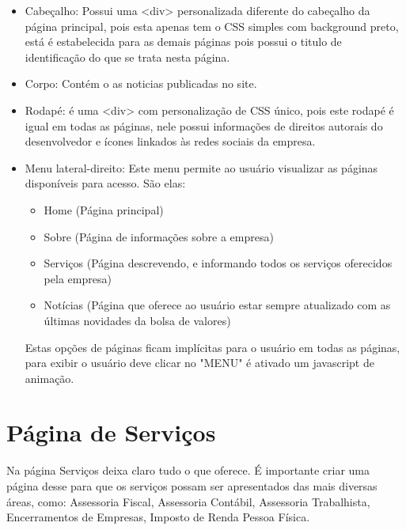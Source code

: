 \documentclass[
	12pt,				%
    oneside,			%
	a4paper,			%
	english,			%
	french,				%
	spanish,			%
	brazil,				%
	]{abntex2}
\begin{document}
\begin{itemize}
	\item{Cabeçalho: Possui uma <div> personalizada diferente do cabeçalho da página principal, pois esta apenas tem o CSS simples com background preto, está é estabelecida para as demais páginas pois possui o titulo de identificação do que se trata nesta página.}
	\item{Corpo: Contém o as noticias publicadas no site.}
	\item{Rodapé: é uma <div> com personalização de CSS único, pois este rodapé é igual em todas as páginas, nele possui informações de direitos autorais do desenvolvedor e ícones linkados às redes sociais da empresa.}
	
	\item{Menu lateral-direito: Este menu permite ao usuário visualizar as páginas disponíveis para acesso. São elas: 
	
	\begin{itemize}
			
	\item{Home (Página principal)}
	\item{Sobre (Página de informações sobre a empresa)}
	\item{Serviços (Página descrevendo, e informando todos os serviços oferecidos pela empresa)} 		    \item{Notícias (Página que oferece ao usuário estar sempre atualizado com as últimas novidades da bolsa de valores)}
	
	\end{itemize}
	
	Estas opções de páginas ficam implícitas para o usuário em todas as páginas, para exibir o usuário deve clicar no "MENU" é ativado um javascript de animação.
}
\end{itemize}

\chapter{Página de Serviços}

Na página Serviços deixa claro tudo o que oferece. É importante criar uma página desse para que os serviços possam ser apresentados das mais diversas áreas, como: Assessoria Fiscal, Assessoria Contábil, Assessoria Trabalhista, Encerramentos de Empresas, Imposto de Renda Pessoa Física. 
\end{document}

